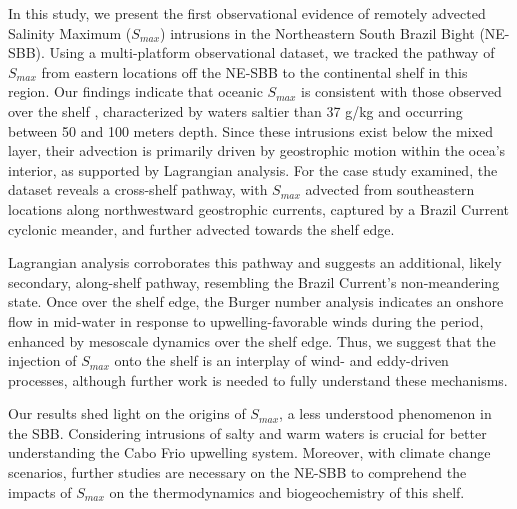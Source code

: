 \documentclass[draft]{agujournal2019}
\begin{document}
In this study, we present the first observational evidence of remotely advected Salinity Maximum (\textit{$S_{max}$}) intrusions in the Northeastern South Brazil Bight (NE-SBB). Using a multi-platform observational dataset, we tracked the pathway of \textit{$S_{max}$} from eastern locations off the NE-SBB to the continental shelf in this region. Our findings indicate that oceanic \textit{$S_{max}$} is consistent with those observed over the shelf \cite{silva2023inventory}, characterized by waters saltier than 37 g/kg and occurring between 50 and 100 meters depth. Since these intrusions exist below the mixed layer, their advection is primarily driven by geostrophic motion within the ocea's interior, as supported by Lagrangian analysis. For the case study examined, the dataset reveals a cross-shelf pathway, with \textit{$S_{max}$} advected from southeastern locations along northwestward geostrophic currents,  captured by a Brazil Current cyclonic meander, and further advected towards the shelf edge.

Lagrangian analysis corroborates this pathway and suggests an additional, likely secondary, along-shelf pathway, resembling the Brazil Current’s non-meandering state. Once over the shelf edge, the Burger number analysis indicates an onshore flow in mid-water in response to upwelling-favorable winds during the period, enhanced by mesoscale dynamics over the shelf edge. Thus, we suggest that the injection of \textit{$S_{max}$} onto the shelf is an interplay of wind- and eddy-driven  processes, although further work is needed to fully understand these mechanisms.

Our results shed light on the origins of \textit{$S_{max}$}, a less understood phenomenon in the SBB. Considering intrusions of salty and warm waters is crucial for better understanding the Cabo Frio upwelling system. Moreover, with climate change scenarios, further studies are necessary on the NE-SBB to comprehend the impacts of \textit{$S_{max}$} on the thermodynamics and biogeochemistry of this shelf.

%
%
\end{document}

